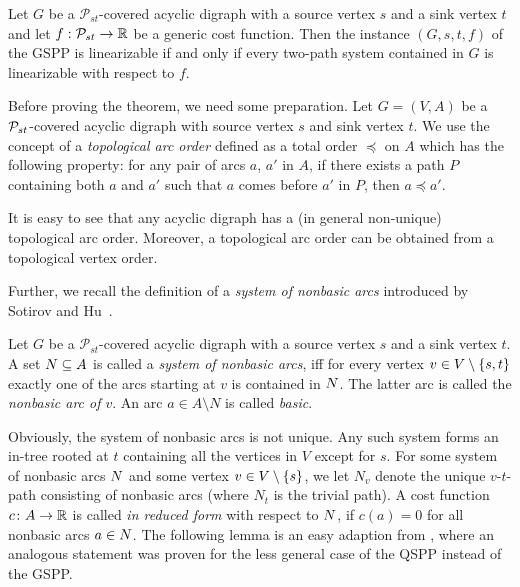 \begin{theorem}
\label{thm_linearization_characterization}
Let $G$ be a $\mathcal{P}_{st}$-covered acyclic digraph with a source vertex $s$ and a sink vertex $t$ and  let $f : \mathcal{P}_{st} \rightarrow \mathbb{R}$ be a generic cost function. Then the instance $(G,s,t,f)$ of the GSPP  is linearizable if and only if every two-path system contained in $G$ is linearizable with respect to $f$.
\end{theorem}

 Before proving the theorem, we need some preparation. Let $G = (V,A)$ be a $\mathcal{P}_{st}$-covered acyclic digraph with source vertex $s$ and sink vertex $t$. 
 We use  the concept of 
 a \emph{topological arc order} defined as   a total 
 order $\preceq$ on $A$ which has the following property: for any pair of arcs $a$, $a'$ in $A$,  if there  exists a path $P$  containing both $a$ and $a'$ such that $a$ comes before $a'$ in $P$, then $a\preceq a'$. 

 
 It is easy to see  that any acyclic digraph has a (in general non-unique)  topological arc order. Moreover, a topological arc order  can be obtained from a topological vertex order. 
 
 Further, we recall the definition of a \emph{system of nonbasic arcs}  introduced by  Sotirov and Hu~\cite{huSo2021}.  
 \begin{definition}\label{nonbasic:def}
 Let $G$ be a $\mathcal{P}_{st}$-covered acyclic digraph with a source vertex $s$ and a sink vertex $t$. A set $N \subseteq A$ is called a \emph{system of nonbasic arcs}, iff for every vertex $v \in V \setminus \{ s,t \}$ exactly one of the arcs starting at $v$ is contained in $N$. The latter  arc is called the \emph{nonbasic arc of $v$}. An arc $a \in A \setminus N$ is called \emph{basic}.
 \end{definition}
 Obviously, the system of nonbasic arcs is not unique.  Any such system  forms an in-tree rooted at $t$ containing   all the vertices in $V$ except for $s$. For some system of nonbasic arcs $N$ and some vertex $v \in V \setminus \{ s \}$, we let $N_v$ denote the unique $v$-$t$-path consisting  of nonbasic arcs (where $N_t$ is the trivial path).  A  cost function $c\colon A \rightarrow \mathbb{R}$ is called \emph{in reduced form} with respect to $N$, if $c(a) = 0$ for all nonbasic arcs $a \in N$. The following lemma is an easy adaption from \cite{huSo2021}, where an analogous statement was proven for the less general case of the QSPP instead of the GSPP.


